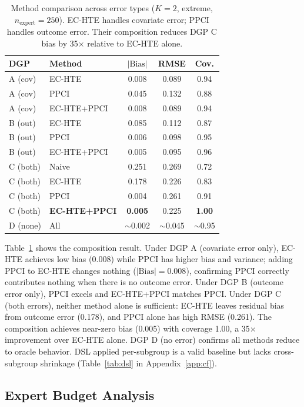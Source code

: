 \documentclass[11pt,twocolumn]{article}
\begin{document}
\begin{table}[t]
\centering
\caption{Method comparison across error types ($K\!=\!2$, extreme, $n_{\text{expert}}\!=\!250$). EC-HTE handles covariate error; PPCI handles outcome error. Their composition reduces DGP C bias by 35$\times$ relative to EC-HTE alone.}
\label{tab:ppci_comparison}
\small
\begin{tabular}{@{}llccc@{}}
\toprule
DGP & Method & $|\text{Bias}|$ & RMSE & Cov. \\
\midrule
A (cov) & EC-HTE & 0.008 & 0.089 & 0.94 \\
A (cov) & PPCI & 0.045 & 0.132 & 0.88 \\
A (cov) & EC-HTE+PPCI & 0.008 & 0.089 & 0.94 \\
\midrule
B (out) & EC-HTE & 0.085 & 0.112 & 0.87 \\
B (out) & PPCI & 0.006 & 0.098 & 0.95 \\
B (out) & EC-HTE+PPCI & 0.005 & 0.095 & 0.96 \\
\midrule
C (both) & Naive & 0.251 & 0.269 & 0.72 \\
C (both) & EC-HTE & 0.178 & 0.226 & 0.83 \\
C (both) & PPCI & 0.004 & 0.261 & 0.91 \\
C (both) & \textbf{EC-HTE+PPCI} & \textbf{0.005} & 0.225 & \textbf{1.00} \\
\midrule
D (none) & All & $\sim$0.002 & $\sim$0.045 & $\sim$0.95 \\
\bottomrule
\end{tabular}
\end{table}

Table~\ref{tab:ppci_comparison} shows the composition result. Under DGP A (covariate error only), EC-HTE achieves low bias (0.008) while PPCI has higher bias and variance; adding PPCI to EC-HTE changes nothing ($|\text{Bias}| = 0.008$), confirming PPCI correctly contributes nothing when there is no outcome error. Under DGP B (outcome error only), PPCI excels and EC-HTE+PPCI matches PPCI. Under DGP C (both errors), neither method alone is sufficient: EC-HTE leaves residual bias from outcome error (0.178), and PPCI alone has high RMSE (0.261). The composition achieves near-zero bias (0.005) with coverage 1.00, a 35$\times$ improvement over EC-HTE alone. DGP D (no error) confirms all methods reduce to oracle behavior. DSL applied per-subgroup is a valid baseline but lacks cross-subgroup shrinkage (Table~\ref{tab:dsl} in Appendix~\ref{app:cf}).

\subsection{Expert Budget Analysis}
\label{sec:budget_exp}
\end{document}
